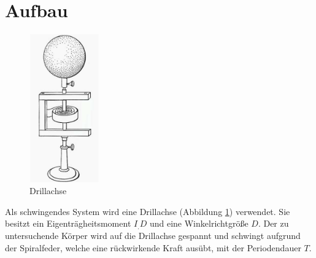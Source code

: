 \section{Aufbau}
\label{sec:Aufbau}
\begin{figure}
\centering
\includegraphics[width=3cm]{content/images/Drillachse.png} 
\caption{Drillachse\cite{V101}}
\label{fig:Drillachse}
\end{figure}
Als schwingendes System wird eine Drillachse (Abbildung \ref{fig:Drillachse}) verwendet. Sie besitzt ein Eigenträgheitsmoment $I_.D$ und eine Winkelrichtgröße $D$.
Der zu untersuchende Körper wird auf die Drillachse gespannt und schwingt aufgrund der Spiralfeder, welche eine rückwirkende Kraft ausübt, mit der Periodendauer $T$.